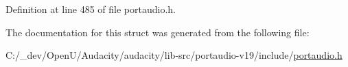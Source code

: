 Definition at line 485 of file portaudio.\+h.



The documentation for this struct was generated from the following file\+:\begin{DoxyCompactItemize}
\item 
C\+:/\+\_\+dev/\+Open\+U/\+Audacity/audacity/lib-\/src/portaudio-\/v19/include/\hyperlink{portaudio_8h}{portaudio.\+h}\end{DoxyCompactItemize}
